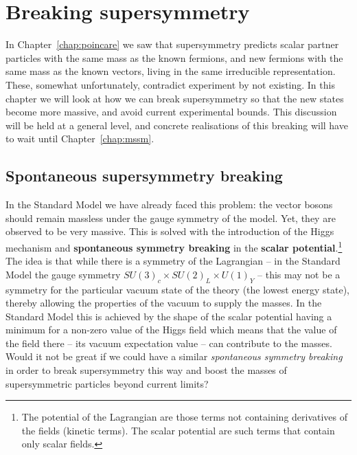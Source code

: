 \documentclass[notes.tex]{subfiles}
\begin{document}
\chapter{Breaking supersymmetry}
\label{chap:breaking}
In Chapter~\ref{chap:poincare} we  saw that  supersymmetry predicts scalar partner particles with the same mass as the known fermions, and new fermions with the same mass as the known vectors, living in the same irreducible representation. These, somewhat unfortunately, contradict experiment by not existing. In this chapter we will look at how we can break supersymmetry so that the new states become more massive, and avoid current experimental bounds. This discussion will be held at a general level, and concrete realisations of this breaking will have to wait until Chapter~\ref{chap:mssm}.


\section{Spontaneous supersymmetry breaking}
\label{sec:ssb}
In the Standard Model we have already faced this problem: the vector bosons should remain massless under the gauge symmetry of the model. Yet, they are observed to be very massive. This is solved with the introduction of the Higgs mechanism and {\bf spontaneous symmetry breaking} in the {\bf scalar potential}.\footnote{The potential of the Lagrangian are those terms not containing derivatives of the fields (kinetic terms). The scalar potential are such terms that contain only scalar fields.} The idea is that while there is a symmetry of the Lagrangian -- in the Standard Model the gauge symmetry $SU(3)_c\times SU(2)_L\times U(1)_Y$ -- this may not be a symmetry for the particular vacuum state of the theory (the lowest energy state), thereby allowing the properties of the vacuum to supply the masses. In the Standard Model this is achieved by the shape of the scalar potential having a minimum for a non-zero value of the Higgs field which means that the value of the field there -- its vacuum expectation value -- can contribute to the masses. Would it not be great if we could have a similar {\it spontaneous symmetry breaking} in order to break supersymmetry this way and boost the masses of supersymmetric particles beyond current limits?
\end{document}
